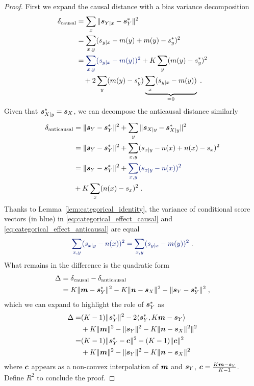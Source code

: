 \begin{subappendices}
\begin{proof}
First we expand the causal distance with a bias variance decomposition
\begin{align}
    \delta_\text{causal} 
    &= \sum_x \|\vs_{Y|x} - \vs^*_Y \|^2 \nonumber\\
    &= \sum_{x,y} (\evs_{y|x} - \mm(y) + \mm(y)- \evs^*_y )^2 \nonumber\\
    &= \textcolor{blue}{\sum_{x,y} (\evs_{y|x} - \mm(y))^2 } 
    +K \sum_y ( \mm(y)- \evs^*_y )^2 
    \label{eq:categorical_effect_causal} \nonumber\\
    & \quad + 2\sum_y (\mm(y)- \evs^*_y ) \underbrace{\sum_x (\evs_{y|x} - \mm(y))}_{=0} \; . 
\end{align}
Given that ${\bm{s}}^*_{X|y} = {\bm{s}}_{X}$, we can decompose the anticausal distance similarly
\begin{align}
    \delta_\text{anticausal} 
    &= \|\vs_Y - \vs^*_Y \|^2 + \sum_y \| \vs_{X|y} - \vs^*_{X|y}\|^2 \nonumber\\
    &= \|\vs_Y - \vs^*_Y \|^2 + \sum_{x,y}  (\evs_{x|y} - \nn(x) + \nn(x) - \evs_x )^2\nonumber \\
    &= \|\vs_Y - \vs^*_Y \|^2 
    + \textcolor{blue}{\sum_{x,y}  (\evs_{x|y} - \nn(x))^2}\nonumber\\ 
    &+  K \sum_x (\nn(x) - \evs_x )^2 
    \label{eq:categorical_effect_anticausal}\; .
\end{align}
Thanks to Lemma~\ref{lem:categorical_identity}, the variance of conditional score vectors (in blue) in \eqref{eq:categorical_effect_causal} and \eqref{eq:categorical_effect_anticausal} are equal
\begin{align*}
 \textcolor{blue}{\sum_{x,y}  (\evs_{x|y} - \nn(x))^2 
 = \sum_{x,y} (\evs_{y|x} - \mm(y))^2} \; .
\end{align*}
What remains in the difference is the quadratic form
\begin{align*}
    \Delta 
    &= \delta_\text{causal} - \delta_\text{anticausal} \\
    &=  K \|{\bm{m}} - {\bm{s}}^*_Y\|^2  
    - K\|{\bm{n}} - {\bm{s}}_X \|^2
    - \| {\bm{s}}_Y - {\bm{s}}^*_Y \|^2 \; ,
\end{align*}
which we can expand to highlight the role of ${\bm{s}}^*_Y$ as
\begin{align*}
    \Delta
    =& (K-1) \|{\bm{s}}^*_Y\|^2
    - 2 \langle {\bm{s}}^*_Y, K{\bm{m}} - {\bm{s}}_Y \rangle \\
    & + K\|{\bm{m}}\|^2  - \|{\bm{s}}_Y\|^2 
    - K\|{\bm{n}} - {\bm{s}}_X\|^2 \|^2 \\
    =& (K-1) \|{\bm{s}}^*_Y - {\bm{c}}\|^2
    - (K-1) \|{\bm{c}}\|^2 \\
    & + K\|{\bm{m}}\|^2  - \|{\bm{s}}_Y\|^2 
    - K\|{\bm{n}} - {\bm{s}}_X\|^2 
\end{align*}
where ${\bm{c}}$ appears as a non-convex interpolation of ${\bm{m}}$ and ${\bm{s}}_Y$, 
${\bm{c}} = \frac{K{\bm{m}} - {\bm{s}}_Y }{K-1}$. 
Define $R^2$ to conclude the proof.
\end{proof}



\end{subappendices}
